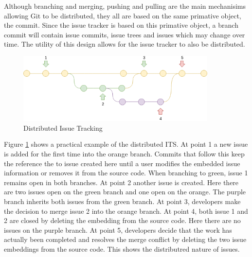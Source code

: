\documentclass{mproj}
\begin{document}
Although branching and merging, pushing and pulling are the main mechanisims allowing Git to be distributed, they all are based on the same primative object, the commit. Since the issue tracker is based on this primative object, a branch commit will contain issue commits, issue trees and issues which may change over time. The utility of this design allows for the issue tracker to also be distributed.


\begin{figure}[t]
\caption{Distributed Issue Tracking}
\label{fig:distributed-issue-tracking}
\centering
\includegraphics[width=10cm]{distributed-issue-tracking}
\end{figure}

Figure \ref{fig:distributed-issue-tracking} shows a practical example of the distributed ITS. At point 1 a new issue is added for the first time into the orange branch. Commits that follow this keep the reference the to issue created here until a user modifies the embedded issue information or removes it from the source code. When branching to green, issue 1 remains open in both branches. At point 2 another issue is created. Here there are two issues open on the green branch and one open on the orange. The purple branch inherits both issues from the green branch. At point 3, developers make the decision to merge issue 2 into the orange branch. At point 4, both issue 1 and 2 are closed by deleting the embedding from the source code. Here there are no issues on the purple branch. At point 5, developers decide that the work has actually been completed and resolves the merge conflict by deleting the two issue embeddings from the source code. This shows the distributred nature of issues.
\end{document}
